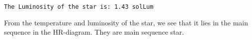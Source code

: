 \documentclass[11pt]{article}
\begin{document}
    \begin{Verbatim}[commandchars=\\\{\}]
The Luminosity of the star is: 1.43 solLum

    \end{Verbatim}

    From the temperature and luminosity of the star, we see that it lies in
the main sequence in the HR-diagram. They are main sequence star.


    
    
    
    
\end{document}
